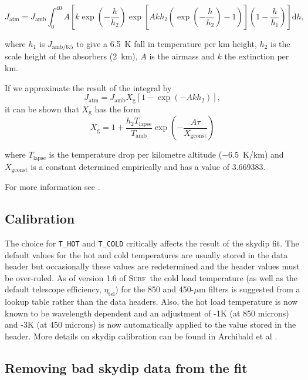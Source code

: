 \documentclass[twoside,11pt]{starlink}
\providecommand{\scusoft}          {\textsc{Surf}}
\begin{document}
\begin{equation}
J_{\mathrm{atm}} = J_{\mathrm{amb}} \int_0^{40}\! A \left[k\exp\left(-\frac{h}{h_2}
\right)\exp\left[A k h_2 \left(\exp\left(-\frac{h}{h_2}\right)-1\right)\right]
\left(1-\frac{h}{h_1}\right)\right]\mathrm{d}h,
\end{equation}

where $h_1$ is $J_{\mathrm{amb}/6.5}$ to give a 6.5~K fall in temperature per km
height, $h_2$ is the scale height of the absorbers (2~km), $A$ is the airmass
and $k$ the extinction per km.

If we approximate the result of the integral by
\begin{equation}
J_{\mathrm{atm}} = J_{\mathrm{amb}} X_{\mathrm{g}} \left[1-\exp\left(-A k h_2\right)\right],
\end{equation}
it can be shown that $X_{\mathrm{g}}$ has the form
\begin{equation}
X_{\mathrm{g}} = 1 + \frac{h_2 T_{\mathrm{lapse}}}{T_{\mathrm{amb}}}\exp\left(-\frac{A \tau}{X_{\mathrm{gconst}}}\right)
\end{equation}

where $T_{\mathrm{lapse}}$ is the temperature drop per kilometre altitude
($-6.5$~K/km) and $X_{\mathrm{gconst}}$ is a constant determined empirically and
has a value of 3.669383.

For more information see \cite{skydip}.

\subsection{Calibration}

The choice for \texttt{T\_HOT} and \texttt{T\_COLD} critically affects the
result of the skydip fit. The default values for the hot and cold temperatures
are usually stored in the data header but occasionally these values are
redetermined and the header values must be over-ruled.  As of version 1.6 of
\scusoft\ the cold load temperature (as well as the default telescope
efficiency, $\eta_{\mathrm{tel}}$) for the 850 and 450-$\mu$m filters is
suggested from a lookup table rather than the data headers. Also, the hot load
temperature is now known to be wavelength dependent and an adjustment of
-1K (at 850 microns) and -3K (at 450 microns) is now automatically applied
to the value stored in the header. More details on skydip calibration
can be found in Archibald et al \cite{scdsn2}.

\subsection{Removing bad skydip data from the fit}
\label{skydips_eg}
\end{document}
